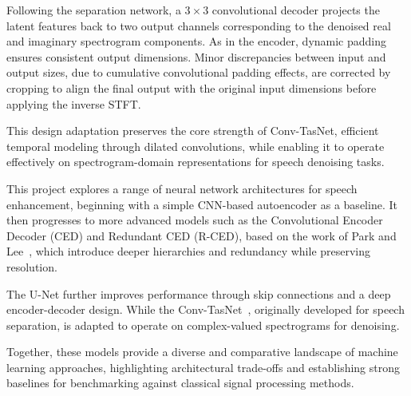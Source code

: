 Following the separation network, a \(3 \times 3\) convolutional decoder projects the latent features back to two output channels corresponding to the denoised real and imaginary spectrogram components. As in the encoder, dynamic padding ensures consistent output dimensions. Minor discrepancies between input and output sizes, due to cumulative convolutional padding effects, are corrected by cropping to align the final output with the original input dimensions before applying the inverse STFT.

This design adaptation preserves the core strength of Conv-TasNet, efficient temporal modeling through dilated convolutions, while enabling it to operate effectively on spectrogram-domain representations for speech denoising tasks.

\vspace{2em}

This project explores a range of neural network architectures for speech enhancement, beginning with a simple CNN-based autoencoder as a baseline. It then progresses to more advanced models such as the Convolutional Encoder Decoder (CED) and Redundant CED (R-CED), based on the work of Park and Lee~\cite{park2017acoustic}, which introduce deeper hierarchies and redundancy while preserving resolution.

The U-Net further improves performance through skip connections and a deep encoder-decoder design. While the Conv-TasNet~\cite{luo2019conv}, originally developed for speech separation, is adapted to operate on complex-valued spectrograms for denoising.

Together, these models provide a diverse and comparative landscape of machine learning approaches, highlighting architectural trade-offs and establishing strong baselines for benchmarking against classical signal processing methods.



